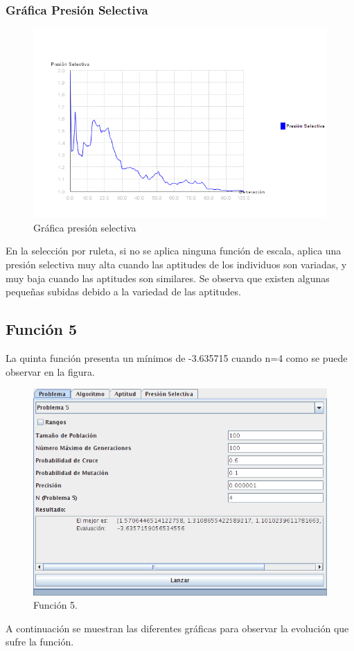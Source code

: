 \documentclass[12pt]{article}
\begin{document}
\subsubsection*{Gráfica Presión Selectiva}
\begin{figure}[H]
\centering
\includegraphics[scale=0.4]{graficas/F4inicial_presion}
\caption{Gráfica presión selectiva}
\label{fig}
\end{figure}
	En la selección por ruleta, si no se aplica ninguna función de escala, aplica una presión selectiva muy alta cuando las aptitudes de los individuos son variadas, y muy baja cuando las aptitudes son similares. Se observa que existen algunas pequeñas subidas debido a la variedad de las aptitudes.
\newpage

\subsection{Función 5}
	La quinta función presenta un mínimos de -3.635715 cuando n=4 como se puede observar en la figura.
\begin{figure}[H]
\centering
\includegraphics[scale=0.4]{graficas/F5inicial}
\caption{Función 5.}
\label{fig}
\end{figure}
	A continuación se muestran las diferentes gráficas para observar la evolución que sufre la función.
\end{document}
